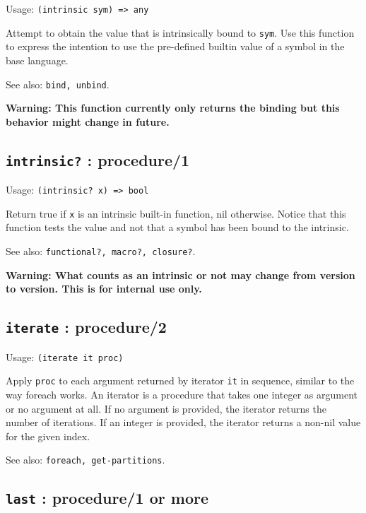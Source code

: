 \documentclass[
]{article}
\newcommand{\passthrough}[1]{#1}
\begin{document}
Usage: \passthrough{\lstinline!(intrinsic sym) => any!}

Attempt to obtain the value that is intrinsically bound to
\passthrough{\lstinline!sym!}. Use this function to express the
intention to use the pre-defined builtin value of a symbol in the base
language.

See also: \passthrough{\lstinline!bind, unbind!}.

\textbf{Warning: This function currently only returns the binding but
this behavior might change in future.}

\hypertarget{intrinsic-procedure1-3}{%
\subsection{\texorpdfstring{\texttt{intrinsic?} :
procedure/1}{intrinsic? : procedure/1}}\label{intrinsic-procedure1-3}}

Usage: \passthrough{\lstinline!(intrinsic? x) => bool!}

Return true if \passthrough{\lstinline!x!} is an intrinsic built-in
function, nil otherwise. Notice that this function tests the value and
not that a symbol has been bound to the intrinsic.

See also: \passthrough{\lstinline!functional?, macro?, closure?!}.

\textbf{Warning: What counts as an intrinsic or not may change from
version to version. This is for internal use only.}

\hypertarget{iterate-procedure2-1}{%
\subsection{\texorpdfstring{\texttt{iterate} :
procedure/2}{iterate : procedure/2}}\label{iterate-procedure2-1}}

Usage: \passthrough{\lstinline!(iterate it proc)!}

Apply \passthrough{\lstinline!proc!} to each argument returned by
iterator \passthrough{\lstinline!it!} in sequence, similar to the way
foreach works. An iterator is a procedure that takes one integer as
argument or no argument at all. If no argument is provided, the iterator
returns the number of iterations. If an integer is provided, the
iterator returns a non-nil value for the given index.

See also: \passthrough{\lstinline!foreach, get-partitions!}.

\hypertarget{last-procedure1-or-more-1}{%
\subsection{\texorpdfstring{\texttt{last} : procedure/1 or
more}{last : procedure/1 or more}}\label{last-procedure1-or-more-1}}
\end{document}
